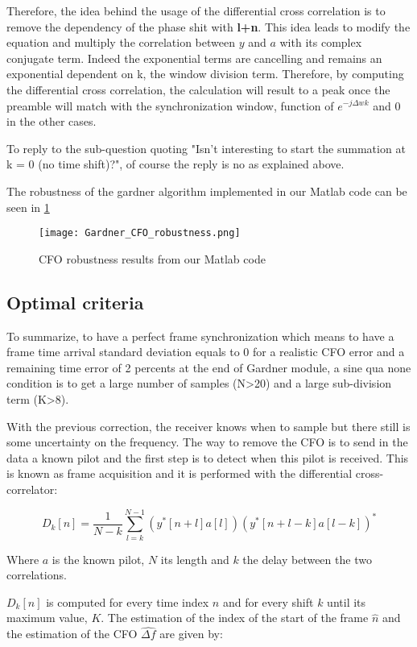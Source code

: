 Therefore, the idea behind the usage of the differential cross correlation is to remove the dependency of the phase shit with \textbf{l+n}.
This idea leads to modify the equation and multiply the correlation between $y$ and $a$ with its complex conjugate term. Indeed the exponential 
terms are cancelling and remains an exponential dependent on k, the window division term.
Therefore, by computing the differential cross correlation, the calculation will result to a peak once the preamble will match with the synchronization
 window, function of $e^{-j\Delta wk}$ and 0 in the other cases.
 
To reply to the sub-question quoting "Isn’t interesting to start the summation at k = 0 (no time shift)?", of course the reply is no as explained above.

The robustness of the gardner algorithm implemented in our Matlab code can be seen in \ref{fig:Gardner_CFO_robustness}

\begin{figure}[H]
    \centering
    \texttt{[image: Gardner\_CFO\_robustness.png]}
    \caption{CFO robustness results from our Matlab code}
    \label{fig:Gardner_CFO_robustness}
\end{figure}

\subsection{Optimal criteria}

To summarize, to have a perfect frame synchronization which means to have a frame time arrival standard deviation equals to 0 for a realistic CFO
error and a remaining time error of 2 percents at the end of Gardner module, a sine qua none condition is to get a large number of 
samples (N>20) and a large sub-division term (K>8).

With the previous correction, the receiver knows when to sample but there still is some uncertainty on the frequency. The way to remove the CFO is to send in the data a known pilot and the first step is to detect when this pilot is received. This is known as frame acquisition and it is performed with the differential cross-correlator:

\begin{equation*}
    D_k[n] = \frac{1}{N-k} \sum_{l=k}^{N-1} \left(y^*[n+l]a[l]\right) \left(y^*[n+l-k]a[l-k]\right)^*
\end{equation*}

Where $a$ is the known pilot, $N$ its length and $k$ the delay between the two correlations. \par
$D_k[n]$ is computed for every time index $n$ and for every shift $k$ until its maximum value, $K$. The estimation of the index of the start of the frame $\hat{n}$ and the estimation of the CFO $\hat{\Delta f}$ are given by:

